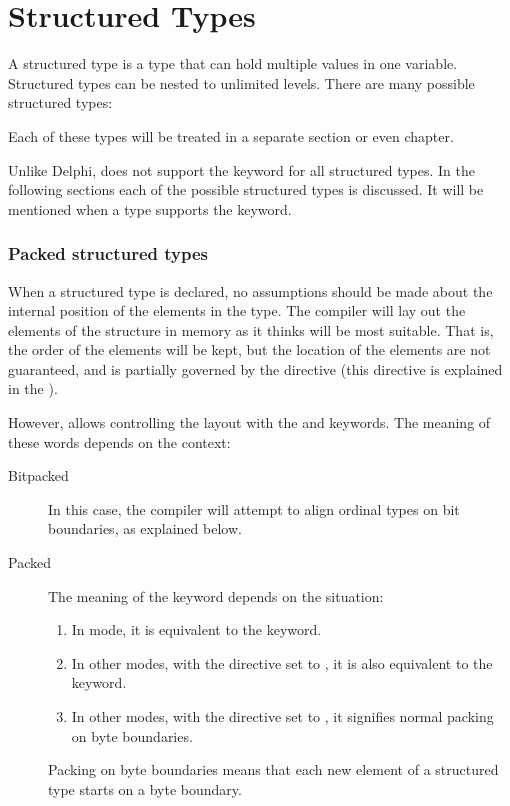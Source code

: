 \section{Structured Types}
A structured type is a type that can hold multiple values in one variable.
Structured types can be nested to unlimited levels. There are many possible structured types:

Each of these types will be treated in a separate section or even chapter.

Unlike Delphi, \fpc does not support the keyword  for all
structured types.  In the following sections each of the possible
structured types is discussed. It will be mentioned when a type supports
the  keyword.
%
%
\subsubsection{Packed structured types}
When a structured type is declared, no assumptions should be made about
the internal position of the elements in the type. The compiler will lay
out  the elements of the structure in memory as it thinks will be most
suitable. That is, the order of the elements will be kept, but the location
of the elements are not guaranteed, and is partially governed by the 
directive (this directive is explained in the \progref).

 
However, \fpc allows controlling the layout with the  and
 keywords. The meaning of these words depends on the context:
\begin{description}
\item[Bitpacked] In this case, the compiler will attempt to align ordinal
types on bit boundaries, as explained below.
\item[Packed] The meaning of the  keyword depends on the
situation:
\begin{enumerate}
\item In  mode, it is equivalent to the  keyword.
\item In other modes, with the  directive set to ,
it is also equivalent to the  keyword.
\item In other modes, with the  directive set to ,
it signifies normal packing on byte boundaries.
\end{enumerate}
Packing on byte boundaries means that each new element of a structured type
starts on a byte boundary.
\end{description}

